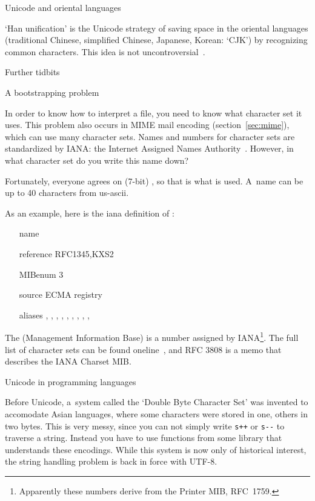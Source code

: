  {Unicode and oriental languages}
\label{sec:unihan}

`Han unification' is the Unicode strategy of saving space in the
oriental languages (traditional Chinese, simplified Chinese, Japanese,
Korean: `CJK') by recognizing common characters. This idea is not
uncontroversial~\cite{han-unification}.

 {Further tidbits}

 {A bootstrapping problem}
\label{sec:mibenum}

In order to know how to interpret a file, you need to know what
character set it uses. This problem also occurs in MIME mail encoding
(section~\ref{sec:mime}), which can use many character sets.  Names
and numbers for character sets are standardized by IANA:
the Internet Assigned Names Authority~\cite{iana}. However, in what
character set do you write this name down?

Fortunately, everyone agrees on (7-bit) \ascii, so that is what is
used. A~name can be up to 40 characters from us-ascii.

As an example, here is the iana definition of \ascii:
\begin{itemize}
\item[name] 
\item[reference] RFC1345,KXS2
\item[MIBenum] 3
\item[source] ECMA registry
\item[aliases] , , ,
  , , ,
  , , , 
\end{itemize}
The  (Management Information Base) is a number assigned by
IANA\footnote{Apparently these numbers derive from the Printer MIB, RFC~1759.}.
The full list of character sets can be found oneline~\cite{iana-list},
and RFC 3808 is a memo that describes the IANA Charset MIB.

 {Unicode in programming languages}

Before Unicode, a~system
called the `Double Byte Character Set' was invented 
to accomodate Asian languages, where
some characters were stored in one, others in two bytes. This is very
messy, since you can not simply write \verb-s++- or \verb+s--+ to
traverse a string. Instead you have to use functions from some library
that understands these encodings. While this system is now only of
historical interest, the string handling problem is back in force with
UTF-8.

